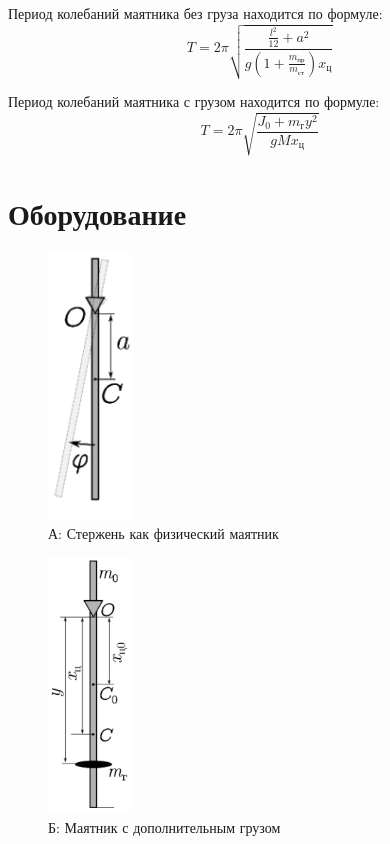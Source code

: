 \documentclass[a4paper,12pt]{article}
\begin{document}
Период колебаний маятника без груза находится по формуле:
\begin{equation}
T = 2\pi\sqrt{\frac{\frac{l^2}{12} + a^2}{g(1 + \frac{m_{\mbox{пр}}}{m_{\mbox{ст}}})x_{\mbox{ц}}}}
\end{equation}

Период колебаний маятника с грузом находится по формуле:
\begin{equation}
T = 2\pi\sqrt{\frac{J_0 + m_{\mbox{г}}y^2}{gMx_{\mbox{ц}}}}
\end{equation}

\section{Оборудование}

\begin{figure}[H]
\begin{center}
\includegraphics[width=0.2\textwidth]{маятник без груза}
\end{center}
\caption{А: Стержень как физический маятник}
\end{figure}

\begin{figure}[H]
\begin{center}
\includegraphics[width=0.2\textwidth]{маятник с грузом}
\end{center}
\caption{Б: Маятник с дополнительным грузом}
\end{figure}
\end{document}
